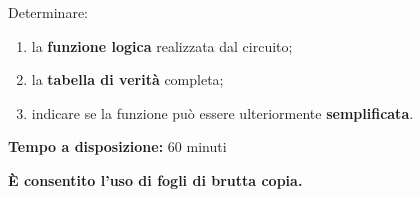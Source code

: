 \documentclass[a4paper,12pt]{article}
\begin{document}
	Determinare:
	
	\begin{enumerate}
		\item la \textbf{funzione logica} realizzata dal circuito;
		\item la \textbf{tabella di verità} completa;
		\item indicare se la funzione può essere ulteriormente \textbf{semplificata}.
	\end{enumerate}
	
	\vspace{1cm}
	
	\textbf{Tempo a disposizione:} 60 minuti
	
	\textbf{È consentito l'uso di fogli di brutta copia.}
	
\end{document}
